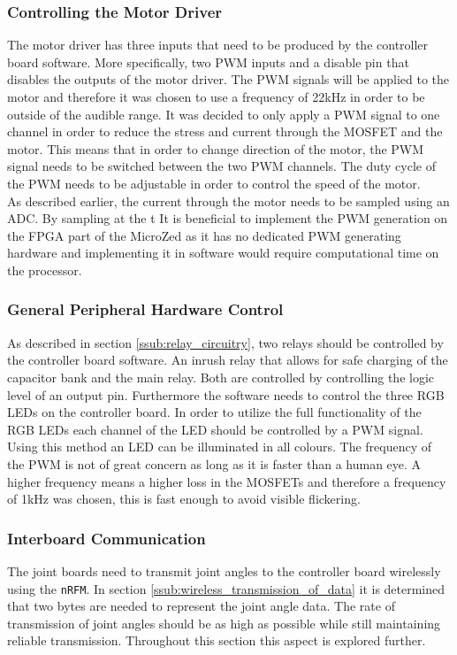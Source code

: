 \subsubsection{Controlling the Motor Driver} %
\label{ssub:controlling_the_motor_driver}
The motor driver has three inputs that need to be produced by the controller board software.
More specifically, two PWM inputs and a disable pin that disables the outputs of the motor driver.
The PWM signals will be applied to the motor and therefore it was chosen to use a frequency of 22kHz in order to be outside of the audible range.
It was decided to only apply a PWM signal to one channel in order to reduce the stress and current through the MOSFET and the motor.
This means that in order to change direction of the motor, the PWM signal needs to be switched between the two PWM channels.
The duty cycle of the PWM needs to be adjustable in order to control the speed of the motor.
\\
As described earlier, the current through the motor needs to be sampled using an ADC. 
By sampling at the t
It is beneficial to implement the PWM generation on the FPGA part of the MicroZed as it has no dedicated PWM generating hardware and implementing it in software would require computational time on the processor.

\subsubsection{General Peripheral Hardware Control} %
\label{ssub:general_peripheral_hardware}
As described in section \ref{ssub:relay_circuitry}, two relays should be controlled by the controller board software. 
An inrush relay that allows for safe charging of the capacitor bank and the main relay. 
Both are controlled by controlling the logic level of an output pin.
Furthermore the software needs to control the three RGB LEDs on the controller board. 
In order to utilize the full functionality of the RGB LEDs each channel of the LED should be controlled by a PWM signal.
Using this method an LED can be illuminated in all colours.
The frequency of the PWM is not of great concern as long as it is faster than a human eye. 
A higher frequency means a higher loss in the MOSFETs and therefore a frequency of 1kHz was chosen, this is fast enough to avoid visible flickering.

\subsubsection{Interboard Communication} %
\label{ssub:interboard_communication}
The joint boards need to transmit joint angles to the controller board wirelessly using the \texttt{nRFM}.
In section  \ref{ssub:wireless_transmission_of_data} it is determined that two bytes are needed to represent the joint angle data.
The rate of transmission of joint angles should be as high as possible while still maintaining reliable transmission.
Throughout this section this aspect is explored further.

